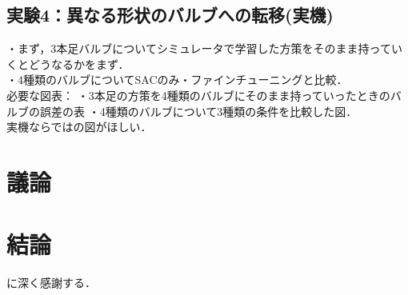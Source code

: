 \documentclass[dvipdfmx]{ampbt_nomag}
\def\numberofspines{1}
\begin{document}
\subsection{実験4：異なる形状のバルブへの転移(実機)}
・まず，3本足バルブについてシミュレータで学習した方策をそのまま持っていくとどうなるかをまず．\\
・4種類のバルブについてSACのみ・ファインチューニングと比較．\\
必要な図表：
・3本足の方策を4種類のバルブにそのまま持っていったときのバルブの誤差の表
・4種類のバルブについて3種類の条件を比較した図．\\
実機ならではの図がほしい．


\clearpage
\section{議論}\label{sec-discussion}

\clearpage
\section{結論}\label{sec-conclusion}



\acknowledgment
に深く感謝する．




\appendix


\fi
\ifoutputcover
\cleardoublepage
\makecover                      %
\makespine[\numberofspines]     %
\fi
\ifoutputabstractforsubmission
\makeabstractforsubmission      %
\fi
\end{document}

